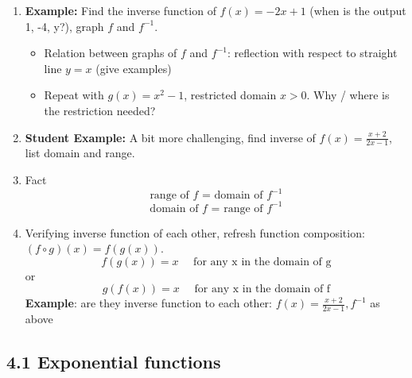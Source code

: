 \documentclass{article}
\begin{document}
\begin{enumerate}
\begin{enumerate}
\item {\bf Example:} Find the inverse function of $f(x) = -2x+1$ (when is the output 1, -4, y?), graph $f$ and $f^{-1}$.
\begin{itemize}
\item Relation between graphs of $f$ and $f^{-1}$: reflection with respect to straight line $y=x$ (give examples)
\item Repeat with $g(x)=x^2-1$, restricted domain $x>0$. Why / where is the restriction needed?
\end{itemize}

\item {\bf Student Example:}  A bit more challenging, find inverse of $f(x)  = \frac{x+2}{2x-1}$, list domain and range.
\item Fact
$$\text{range of $f$ = domain of $f^{-1}$}$$
$$\text{domain of $f$ = range of $f^{-1}$}$$

\item Verifying inverse function of each other, refresh function composition: $(f\circ g)(x)=f(g(x))$.
$$
f(g(x)) = x \quad \text{ for any x in the domain of g}
$$
or
$$
g(f(x)) = x \quad \text{ for any x in the domain of f} 
$$
{\bf Example}: are they inverse function to each other: $f(x)  = \frac{x+2}{2x-1}, f^{-1}$ as above
\end{enumerate}
\end{enumerate}


\subsection{4.1 Exponential functions}
\end{document}
